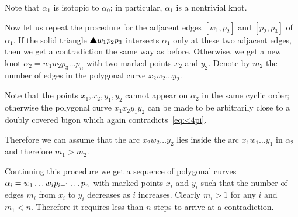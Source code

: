 Note that $\alpha_1$ is isotopic to $\alpha_0$;
in particular, $\alpha_1$ is a nontrivial knot.

Now let us repeat the procedure for the adjacent edges $[w_1,p_2]$ and $[p_2,p_3]$ of $\alpha_1$.
If the solid triangle $\solidtriangle w_1p_2p_3$ intersects $\alpha_1$ only at these two adjacent edges, then we get a contradiction the same way as before.
Otherwise, we get a new knot $\alpha_2=w_1w_2p_3\dots p_n$ with two marked points $x_2$ and $y_2$.
Denote by $m_2$ the number of edges in the polygonal curve $x_2w_2\dots y_2$.

Note that the points $x_1,x_2,y_1,y_2$ cannot appear on $\alpha_2$ in the same cyclic order;
otherwise the polygonal curve $x_1x_2y_1y_2$ can be made to be arbitrarily close to a doubly covered bigon which again contradicts~\ref{eq:<4pi}.

Therefore we can assume that the arc $x_2w_2\dots y_2$ lies inside the arc $x_1w_1\dots y_1$ in $\alpha_2$
and therefore $m_1>m_2$.

Continuing this procedure we get a sequence of polygonal curves $\alpha_i\z=w_1\dots w_i p_{i+1}\dots p_n$ with marked points $x_i$ and $y_i$ such that the number of edges $m_i$ from $x_i$ to $y_i$ decreases as $i$ increases.
Clearly $m_i>1$ for any $i$ and $m_1<n$.
Therefore it requires less than $n$ steps to arrive at a contradiction.
\qeds

